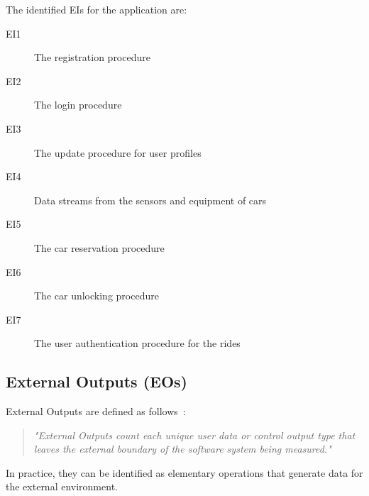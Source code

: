 The identified EIs for the application are:
\begin{description}
\item[EI1] The registration procedure %
\item[EI2] The login procedure %
\item[EI3] The update procedure for user profiles %
\item[EI4] Data streams from the sensors and equipment of cars %
\item[EI5] The car reservation procedure %
\item[EI6] The car unlocking procedure %
\item[EI7] The user authentication procedure for the rides %
\end{description}

\subsection{External Outputs (EOs)}
External Outputs are defined as follows~\cite{cocomo-manual}:
\begin{quotation}
\textit{"External Outputs count each unique user data or control output type that leaves the external boundary of the software system being measured."}
\end{quotation}
In practice, they can be identified as elementary operations that generate data for the external environment.

